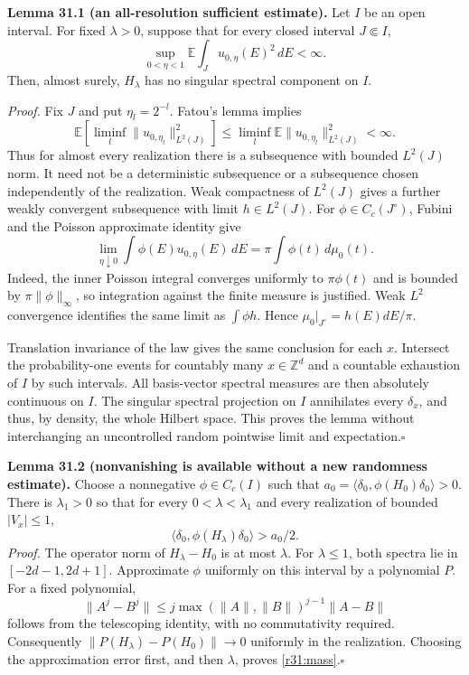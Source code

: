 \documentclass[11pt,a4paper]{article}
\newcommand{\Z}{\mathbb{Z}}
\numberwithin{equation}{section}
\begin{document}
\textbf{Lemma 31.1 (an all-resolution sufficient estimate).}
Let $I$ be an open interval. For fixed $\lambda>0$, suppose that for every
closed interval $J\Subset I$,
\begin{equation}\label{r31:missing}
 \sup_{0<\eta<1}\mathbb E\int_J u_{0,\eta}(E)^2\,dE<\infty.
\end{equation}
Then, almost surely, $H_\lambda$ has no singular spectral component on $I$.

\emph{Proof.} Fix $J$ and put $\eta_l=2^{-l}$. Fatou's lemma implies
\[
 \mathbb E\left[\liminf_l\|u_{0,\eta_l}\|_{L^2(J)}^2\right]
       \le\liminf_l\mathbb E\|u_{0,\eta_l}\|_{L^2(J)}^2<\infty.
\]
Thus for almost every realization there is a subsequence with bounded
$L^2(J)$ norm. It need not be a deterministic subsequence or a subsequence
chosen independently of the realization. Weak compactness of $L^2(J)$ gives
a further weakly convergent subsequence with limit $h\in L^2(J)$.
For $\phi\in C_c(J^\circ)$, Fubini and the Poisson approximate identity give
\[
 \lim_{\eta\downarrow0}\int\phi(E)u_{0,\eta}(E)\,dE
                 =\pi\int\phi(t)\,d\mu_0(t).
\]
Indeed, the inner Poisson integral converges uniformly to $\pi\phi(t)$
and is bounded by $\pi\|\phi\|_\infty$, so integration against the finite
measure is justified. Weak $L^2$ convergence identifies the same limit as
$\int\phi h$. Hence $\mu_0|_{J^\circ}=h(E)dE/\pi$.

Translation invariance of the law gives the same conclusion for each $x$.
Intersect the probability-one events for countably many $x\in\Z^d$ and a
countable exhaustion of $I$ by such intervals. All basis-vector spectral
measures are then absolutely continuous on $I$. The singular spectral
projection on $I$ annihilates every $\delta_x$, and thus, by density, the
whole Hilbert space. This proves the lemma without interchanging an
uncontrolled random pointwise limit and expectation.\hfill$\square$

\textbf{Lemma 31.2 (nonvanishing is available without a new randomness estimate).}
Choose a nonnegative $\phi\in C_c(I)$ such that
$a_0=\langle\delta_0,\phi(H_0)\delta_0\rangle>0$. There is $\lambda_1>0$
so that for every $0<\lambda<\lambda_1$ and every realization of bounded
$|V_x|\le1$,
\begin{equation}\label{r31:mass}
           \langle\delta_0,\phi(H_\lambda)\delta_0\rangle>a_0/2.
\end{equation}
\emph{Proof.} The operator norm of $H_\lambda-H_0$ is at most $\lambda$.
For $\lambda\le1$, both spectra lie in $[-2d-1,2d+1]$. Approximate $\phi$
uniformly on this interval by a polynomial $P$. For a fixed polynomial,
\[
 \|A^j-B^j\|\le j\max(\|A\|,\|B\|)^{j-1}\|A-B\|
\]
follows from the telescoping identity, with no commutativity required.
Consequently $\|P(H_\lambda)-P(H_0)\|\to0$ uniformly in the realization.
Choosing the approximation error first, and then $\lambda$, proves
\eqref{r31:mass}.\hfill$\square$
\end{document}
